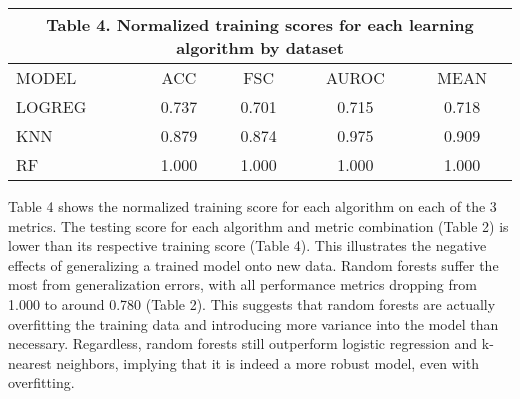 \documentclass[twoside,11pt]{article}
\begin{document}
\begin{table}[htb]
\vspace{2em}
\centering
\begin{tabular}{lcccc}
\multicolumn{5}{c}{Table 4. Normalized training scores for each learning algorithm by dataset}         \\ \hline
\multicolumn{1}{|l|}{MODEL}  & ACC   & FSC   & \multicolumn{1}{c|}{AUROC} & \multicolumn{1}{c|}{MEAN}  \\ \hline
\multicolumn{1}{|l|}{LOGREG} & 0.737 & 0.701 & \multicolumn{1}{c|}{0.715} & \multicolumn{1}{c|}{0.718} \\
\multicolumn{1}{|l|}{KNN}    & 0.879 & 0.874 & \multicolumn{1}{c|}{0.975} & \multicolumn{1}{c|}{0.909} \\
\multicolumn{1}{|l|}{RF}     & 1.000 & 1.000 & \multicolumn{1}{c|}{1.000} & \multicolumn{1}{c|}{1.000} \\ \hline
\end{tabular}
\end{table}

\vspace{2em}
Table 4 shows the normalized training score for each algorithm on each of the 3 metrics. The testing score for each algorithm and metric combination (Table 2) is lower than its respective training score (Table 4). This illustrates the negative effects of generalizing a trained model onto new data. Random forests suffer the most from generalization errors, with all performance metrics dropping from 1.000 to around 0.780 (Table 2). This suggests that random forests are actually overfitting the training data and introducing more variance into the model than necessary. Regardless, random forests still outperform logistic regression and k-nearest neighbors, implying that it is indeed a more robust model, even with overfitting.
\end{document}
